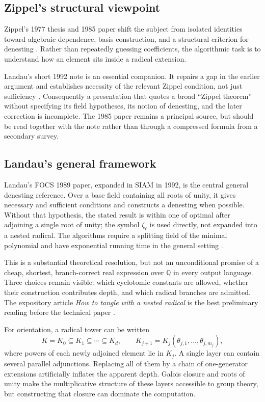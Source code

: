 \documentclass[11pt,a4paper]{article}
\numberwithin{equation}{section}
\theoremstyle{definition}\newtheorem{definition}[theorem]{Definition}
\theoremstyle{remark}\newtheorem{remark}[theorem]{Remark}
\newcommand{\Q}{\mathbb Q}\newcommand{\R}{\mathbb R}\newcommand{\C}{\mathbb C}\newcommand{\Z}{\mathbb Z}
\begin{document}
\subsection{Zippel's structural viewpoint}
Zippel's 1977 thesis and 1985 paper shift the subject from isolated identities toward algebraic dependence, basis construction, and a structural criterion for denesting \cite{zippel77,zippel85}. Rather than repeatedly guessing coefficients, the algorithmic task is to understand how an element sits inside a radical extension.

Landau's short 1992 note is an essential companion. It repairs a gap in the earlier argument and establishes necessity of the relevant Zippel condition, not just sufficiency \cite{landauNote}. Consequently a presentation that quotes a broad ``Zippel theorem'' without specifying its field hypotheses, its notion of denesting, and the later correction is incomplete. The 1985 paper remains a principal source, but should be read together with the note rather than through a compressed formula from a secondary survey.

\subsection{Landau's general framework}
Landau's FOCS 1989 paper, expanded in SIAM in 1992, is the central general denesting reference. Over a base field containing all roots of unity, it gives necessary and sufficient conditions and constructs a denesting when possible. Without that hypothesis, the stated result is within one of optimal after adjoining a single root of unity; the symbol $\zeta_\ell$ is used directly, not expanded into a nested radical. The algorithms require a splitting field of the minimal polynomial and have exponential running time in the general setting \cite{landau92}.

This is a substantial theoretical resolution, but not an unconditional promise of a cheap, shortest, branch-correct real expression over $\Q$ in every output language. Three choices remain visible: which cyclotomic constants are allowed, whether their construction contributes depth, and which radical branches are admitted. The expository article \emph{How to tangle with a nested radical} is the best preliminary reading before the technical paper \cite{landau94}.

For orientation, a radical tower can be written
\[
K=K_0\subseteq K_1\subseteq\cdots\subseteq K_d,
\qquad K_{j+1}=K_j(\theta_{j,1},\ldots,\theta_{j,m_j}),
\]
where powers of each newly adjoined element lie in $K_j$. A single layer can contain several parallel adjunctions. Replacing all of them by a chain of one-generator extensions artificially inflates the apparent depth. Galois closure and roots of unity make the multiplicative structure of these layers accessible to group theory, but constructing that closure can dominate the computation.
\end{document}
